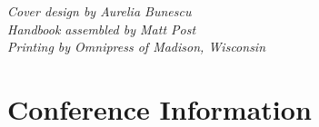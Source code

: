 \documentclass[twoside,makeidx]{book}
\begin{document}


\fancyfoot[C]{}





\cleardoublepage
\thispagestyle{empty}
\vspace*{6in}
\noindent\emph{Cover design by Aurelia Bunescu}\\
\noindent\emph{Handbook assembled by Matt Post}\\
\emph{Printing by Omnipress of Madison, Wisconsin}

\newpage
\cleardoublepage
\fancyfoot[C]{\thepage}
\frontmatter





\setcounter{tocdepth}{2}
\tableofcontents
\mainmatter
\pagestyle{fancy}


\clearpage
\setheaders{}{}



\chapter{Conference Information}


\clearpage


\clearpage%
\setheaders{}{}


%
\clearpage%
\setheaders{}{}
\end{document}
